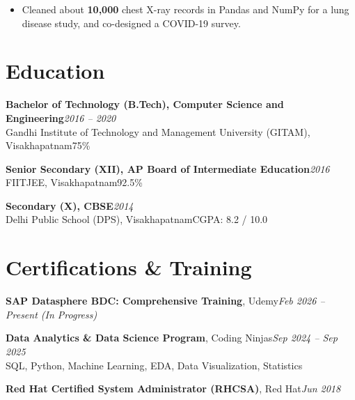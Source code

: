 \documentclass[10pt, letterpaper]{article}
\begin{document}
\begin{itemize}
  \item Cleaned about \textbf{10,000} chest X-ray records in Pandas and NumPy for a lung disease study, and co-designed a COVID-19 survey.
\end{itemize}

\section{Education}

{\bfseries Bachelor of Technology (B.Tech), Computer Science and Engineering}\hfill{\small\color{muted}\textit{2016 -- 2020}}\\
{\small\color{muted}Gandhi Institute of Technology and Management University (GITAM), Visakhapatnam\hfill 75\%}

\vspace{2pt}
{\bfseries Senior Secondary (XII), AP Board of Intermediate Education}\hfill{\small\color{muted}\textit{2016}}\\
{\small\color{muted}FIITJEE, Visakhapatnam\hfill 92.5\%}

\vspace{2pt}
{\bfseries Secondary (X), CBSE}\hfill{\small\color{muted}\textit{2014}}\\
{\small\color{muted}Delhi Public School (DPS), Visakhapatnam\hfill CGPA: 8.2 / 10.0}

\section{Certifications \& Training}

{\bfseries SAP Datasphere BDC: Comprehensive Training}, Udemy\hfill{\small\color{muted}\textit{Feb 2026 -- Present \emph{(In Progress)}}}

\vspace{1pt}
{\bfseries Data Analytics \& Data Science Program}, Coding Ninjas\hfill{\small\color{muted}\textit{Sep 2024 -- Sep 2025}}\\
{\small\color{muted}SQL, Python, Machine Learning, EDA, Data Visualization, Statistics}

\vspace{1pt}
{\bfseries Red Hat Certified System Administrator (RHCSA)}, Red Hat\hfill{\small\color{muted}\textit{Jun 2018}}

\end{document}

